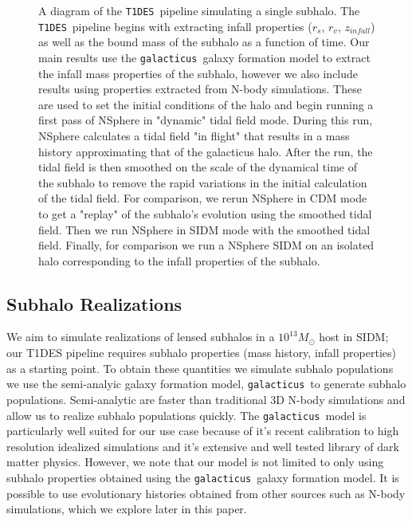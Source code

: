 \documentclass[%
 reprint,
 amsmath,
 amssymb,
 aps,
]{revtex4-2}
\def\gal{{\tt galacticus}~}
\def\tides{{\tt T1DES}~}
\begin{document}
\begin{figure}
 
 \caption{
         A diagram of the \tides pipeline simulating a single subhalo.
         The \tides pipeline begins with extracting infall properties ($r_s$, $r_v$, $z_{infall}$) as well as the bound mass of the subhalo as a function of time. 
         Our main results use the \gal galaxy formation model to extract the infall mass properties of the subhalo, however we also include results using properties extracted from N-body simulations. 
         These are used to set the initial conditions of the halo and begin running a first pass of NSphere in "dynamic" tidal field mode. 
         During this run, NSphere calculates a tidal field "in flight" that results in a mass history approximating that of the galacticus halo. 
         After the run, the tidal field is then smoothed on the scale of the dynamical time of the subhalo to remove the rapid variations in the initial calculation of the tidal field.         
         For comparison, we rerun NSphere in CDM mode to get a "replay" of the subhalo's evolution using the smoothed tidal field.
         Then we run NSphere in SIDM mode with the smoothed tidal field.
         Finally, for comparison we run a NSphere SIDM on an isolated halo corresponding to the infall properties of the subhalo.
         }
 \label{fig:pipeline}
\end{figure}
 

\subsection{Subhalo Realizations}\label{sec-realizations}
We aim to simulate realizations of lensed subhalos in a $10^{13} M_{\odot}$ host in SIDM; our T1DES pipeline requires subhalo properties (mass history, infall properties) as a starting point. To obtain these quantities we simulate subhalo populations we use the semi-analyic galaxy formation model, \gal to generate subhalo populations. Semi-analytic are faster than traditional 3D N-body simulations and allow us to realize subhalo populations quickly. The \gal model is particularly well suited for our use case because of it's recent calibration to high resolution idealized simulations \citep{du2024tidal} and it's extensive and well tested library of dark matter physics. However, we note that our model is not limited to only using subhalo properties obtained using the \gal galaxy formation model. It is possible to use evolutionary histories obtained from other sources such as N-body simulations, which we explore later in this paper.
\end{document}
